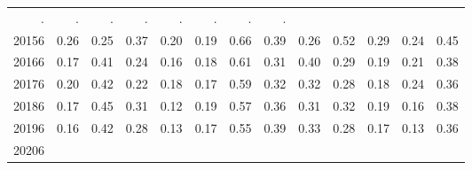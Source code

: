 \begin{table}[!h]
\begin{tabular}{lllllllllllll}
  \multicolumn{1}{r}{.} &
  \multicolumn{1}{r}{.} &
  \multicolumn{1}{r}{.} &
  \multicolumn{1}{r}{.} &
  \multicolumn{1}{r}{.} &
  \multicolumn{1}{r}{.} &
  \multicolumn{1}{r}{.} &
  \multicolumn{1}{r}{.} \\
\multicolumn{1}{l}{\hspace{1em}20156} &
  \multicolumn{1}{|r}{0.26} &
  \multicolumn{1}{r}{0.25} &
  \multicolumn{1}{r}{0.37} &
  \multicolumn{1}{r}{0.20} &
  \multicolumn{1}{r}{0.19} &
  \multicolumn{1}{r}{0.66} &
  \multicolumn{1}{r}{0.39} &
  \multicolumn{1}{r}{0.26} &
  \multicolumn{1}{r}{0.52} &
  \multicolumn{1}{r}{0.29} &
  \multicolumn{1}{r}{0.24} &
  \multicolumn{1}{r}{0.45} \\
\multicolumn{1}{l}{\hspace{1em}20166} &
  \multicolumn{1}{|r}{0.17} &
  \multicolumn{1}{r}{0.41} &
  \multicolumn{1}{r}{0.24} &
  \multicolumn{1}{r}{0.16} &
  \multicolumn{1}{r}{0.18} &
  \multicolumn{1}{r}{0.61} &
  \multicolumn{1}{r}{0.31} &
  \multicolumn{1}{r}{0.40} &
  \multicolumn{1}{r}{0.29} &
  \multicolumn{1}{r}{0.19} &
  \multicolumn{1}{r}{0.21} &
  \multicolumn{1}{r}{0.38} \\
\multicolumn{1}{l}{\hspace{1em}20176} &
  \multicolumn{1}{|r}{0.20} &
  \multicolumn{1}{r}{0.42} &
  \multicolumn{1}{r}{0.22} &
  \multicolumn{1}{r}{0.18} &
  \multicolumn{1}{r}{0.17} &
  \multicolumn{1}{r}{0.59} &
  \multicolumn{1}{r}{0.32} &
  \multicolumn{1}{r}{0.32} &
  \multicolumn{1}{r}{0.28} &
  \multicolumn{1}{r}{0.18} &
  \multicolumn{1}{r}{0.24} &
  \multicolumn{1}{r}{0.36} \\
\multicolumn{1}{l}{\hspace{1em}20186} &
  \multicolumn{1}{|r}{0.17} &
  \multicolumn{1}{r}{0.45} &
  \multicolumn{1}{r}{0.31} &
  \multicolumn{1}{r}{0.12} &
  \multicolumn{1}{r}{0.19} &
  \multicolumn{1}{r}{0.57} &
  \multicolumn{1}{r}{0.36} &
  \multicolumn{1}{r}{0.31} &
  \multicolumn{1}{r}{0.32} &
  \multicolumn{1}{r}{0.19} &
  \multicolumn{1}{r}{0.16} &
  \multicolumn{1}{r}{0.38} \\
\multicolumn{1}{l}{\hspace{1em}20196} &
  \multicolumn{1}{|r}{0.16} &
  \multicolumn{1}{r}{0.42} &
  \multicolumn{1}{r}{0.28} &
  \multicolumn{1}{r}{0.13} &
  \multicolumn{1}{r}{0.17} &
  \multicolumn{1}{r}{0.55} &
  \multicolumn{1}{r}{0.39} &
  \multicolumn{1}{r}{0.33} &
  \multicolumn{1}{r}{0.28} &
  \multicolumn{1}{r}{0.17} &
  \multicolumn{1}{r}{0.13} &
  \multicolumn{1}{r}{0.36} \\
\multicolumn{1}{l}{\hspace{1em}20206} &

\end{tabular}
\end{table}
